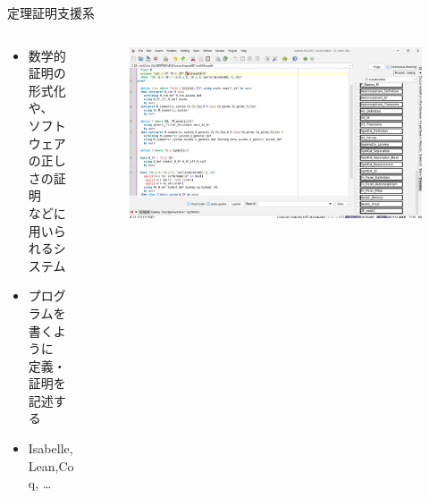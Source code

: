 \documentclass[17pt,aspectratio=169]{beamer}
\begin{document}
\begin{frame}{定理証明支援系}
    \begin{columns}
        \begin{column}{0.65\textwidth}
            \begin{itemize}[itemsep=7pt]
                \item 数学的証明の形式化や、\\ソフトウェアの正しさの証明\\などに用いられるシステム
                \item プログラムを書くように\\定義・証明を記述する
                \item Isabelle,Lean,Coq, \ldots
            \end{itemize}

        \end{column}
        \begin{column}{0.35\textwidth}
            \begin{figure}
                \includegraphics[width=1.0\linewidth]{./images/isabelle_editor.png}
            \end{figure}
            \vspace{-10pt}
            \begin{columns}
                \begin{column}{0.4\textwidth}

\end{column}
\end{columns}
\end{column}
\end{columns}
\end{frame}
\end{document}
